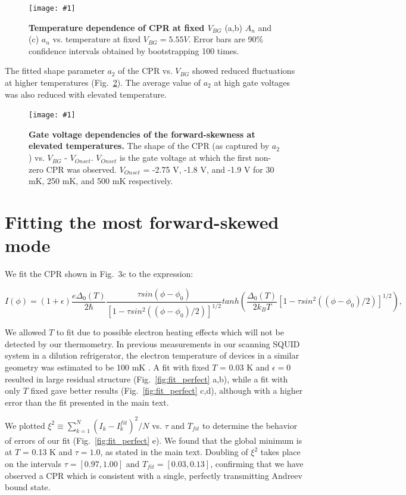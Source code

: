 \documentclass[11pt]{article}
\newcommand{\fig}[5]{
	\begin{figure}
	\centerline{\texttt{[image: \#1]}}
\caption[#3]{\label{#2} \textbf{#3} #4}
\end{figure}}
\begin{document}
\fig{./t_dep.pdf}{fig:t_dep}
{Temperature dependence of CPR at fixed $V_{BG}$ }
{(a,b) $A_n$ and (c) $a_n$ vs. temperature at fixed $V_{BG} = 5.55 V$. Error bars are 90$\%$ confidence intervals obtained by bootstrapping 100 times.}{0.9}

The fitted shape parameter $a_2$ of the CPR vs. $V_{BG}$ showed reduced fluctuations at higher temperatures (Fig.~\ref{fig:fluctuations_vs_T}). The average value of $a_2$ at high gate voltages was also reduced with elevated temperature. 

\fig{./fluctuations_vs_T.pdf}{fig:fluctuations_vs_T}
{Gate voltage dependencies of the forward-skewness at elevated temperatures.}
{The shape of the CPR (as captured by $a_2$) vs. $V_{BG}$ - $V_{Onset}$. $V_{Onset}$ is the gate voltage at which the first non-zero CPR was observed. $V_{Onset}$ = -2.75 V, -1.8 V, and -1.9 V for 30 mK, 250 mK, and 500 mK respectively.}{0.7}

\section{Fitting the most forward-skewed mode}

We fit the CPR shown in Fig.~3c to the expression:

\begin{equation}\label{eq:s1}
I(\phi) = (1+\epsilon)\frac{e \Delta_0(T)}{2 \hbar} \frac{\tau sin(\phi-\phi_0)}{[1-\tau sin^2((\phi-\phi_0)/2)]^{1/2}} tanh(\frac{\Delta_0(T)}{2 k_B T} [1-\tau sin^2((\phi-\phi_0)/2)]^{1/2}), 
\end{equation}

We allowed $T$ to fit due to possible electron heating effects which will not be detected by our thermometry. In previous measurements in our scanning SQUID system in a dilution refrigerator, the electron temperature of devices in a similar geometry was estimated to be 100 mK . A fit with fixed $T$ = 0.03 K and $\epsilon = 0$ resulted in large residual structure (Fig.~\ref{fig:fit_perfect} a,b), while a fit with only $T$ fixed gave better results (Fig.~\ref{fig:fit_perfect} c,d), although with a higher error than the fit presented in the main text. 

We plotted $\xi^2 \equiv \sum_{k=1}^N (I_k - I^{fit}_k)^2/N $ vs. $\tau$ and $T_{fit}$ to determine the behavior of errors of our fit (Fig.~\ref{fig:fit_perfect} e). We found that the global minimum is at $T$ = 0.13 K and $\tau = 1.0$, as stated in the main text. Doubling of $\xi^2$ takes place on the intervals $\tau = [0.97, 1.00]$ and $T_{fit} = [0.03,0.13]$, confirming that we have observed a CPR which is consistent with a single, perfectly transmitting Andreev bound state.
\end{document}
